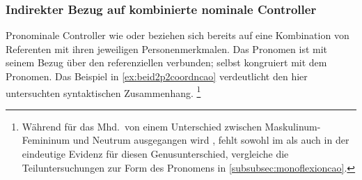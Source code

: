 \subsubsection{Indirekter Bezug auf kombinierte nominale Controller}
\label{subsubsec:beid2p2coordncao}

Pronominale Controller wie  oder  beziehen sich
bereits auf eine Kombination von Referenten mit ihren jeweiligen
Personenmerkmalen. Das Pronomen ist mit seinem Bezug über den referenziellen
\Index{} verbunden;  selbst kongruiert mit dem Pronomen. Das
Beispiel in \cref{ex:beid2p2coordncao} verdeutlicht den hier untersuchten
syntaktischen Zusammenhang.%
%
	\footnote{Während für das  Mhd.\ von einem Unterschied
		zwischen Maskulinum-Femininum  und Neutrum 
		ausgegangen wird \autocites[vgl.][213--214]{paul2007}[369,
		390--397]{ksw2}, fehlt sowohl im \CAO{} als auch in der
		\KC{} eindeutige Evidenz für diesen Genusunterschied, vergleiche
		die Teiluntersuchungen zur Form des Pronomens in
		\cref{subsubsec:monoflexioncao}.}

